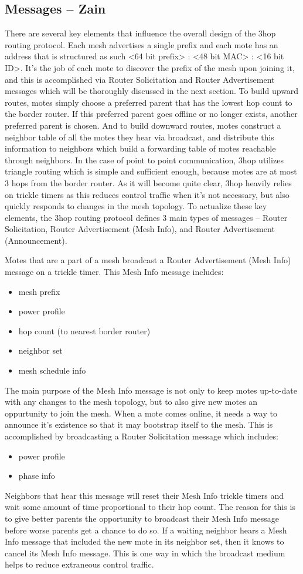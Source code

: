 \subsection{Messages -- Zain}
There are several key elements that influence the overall design of the 3hop routing protocol.
Each mesh advertises a single prefix and each mote has an address that is structured as such <64 bit prefix> : <48 bit MAC> : <16 bit ID>.
It's the job of each mote to discover the prefix of the mesh upon joining it, and this is accomplished via Router Solicitation and Router Advertisement messages which will be thoroughly discussed in the next section.
To build upward routes, motes simply choose a preferred parent that has the lowest hop count to the border router.
If this preferred parent goes offline or no longer exists, another preferred parent is chosen.
And to build downward routes, motes construct a neighbor table of all the motes they hear via broadcast, and distribute this information to neighbors which build a forwarding table of motes reachable through neighbors.
In the case of point to point communication, 3hop utilizes triangle routing which is simple and sufficient enough, because motes are at most 3 hops from the border router.
As it will become quite clear, 3hop heavily relies on trickle timers as this reduces control traffic when it's not necessary, but also quickly responds to changes in the mesh topology.
To actualize these key elements, the 3hop routing protocol defines 3 main types of messages -- Router Solicitation, Router Advertisement (Mesh Info), and Router Advertisement (Announcement).

Motes that are a part of a mesh broadcast a Router Advertisement (Mesh Info) message on a trickle timer. 
This Mesh Info message includes:
\begin{itemize}
\item mesh prefix
\item power profile
\item hop count (to nearest border router)
\item neighbor set
\item mesh schedule info
\end{itemize}
The main purpose of the Mesh Info message is not only to keep motes up-to-date with any changes to the mesh topology, but to also give new motes an oppurtunity to join the mesh.
When a mote comes online, it needs a way to announce it's existence so that it may bootstrap itself to the mesh. 
This is accomplished by broadcasting a Router Solicitation message which includes: 
\begin{itemize}
\item power profile
\item phase info
\end{itemize}
Neighbors that hear this message will reset their Mesh Info trickle timers and wait some amount of time proportional to their hop count. 
The reason for this is to give better parents the opportunity to broadcast their Mesh Info message before worse parents get a chance to do so.
If a waiting neighbor hears a Mesh Info message that included the new mote in its neighbor set, then it knows to cancel its Mesh Info message.
This is one way in which the broadcast medium helps to reduce extraneous control traffic.

